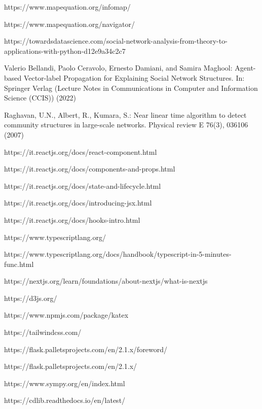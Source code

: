 \documentclass[a4paper,12pt]{report}
\begin{document}
%
%
\begin{thebibliography}{0}
%
https://www.mapequation.org/infomap/

https://www.mapequation.org/navigator/

https://towardsdatascience.com/social-network-analysis-from-theory-to-applications-with-python-d12e9a34c2c7

Valerio Bellandi, Paolo Ceravolo, Ernesto Damiani, and Samira Maghool: Agent-based Vector-label Propagation for Explaining Social Network Structures. In: Springer Verlag (Lecture Notes in Communications in Computer and Information Science (CCIS)) (2022)

Raghavan, U.N., Albert, R., Kumara, S.: Near linear time algorithm to detect
community structures in large-scale networks. Physical review E 76(3), 036106
(2007)

https://it.reactjs.org/docs/react-component.html

https://it.reactjs.org/docs/components-and-props.html

https://it.reactjs.org/docs/state-and-lifecycle.html

https://it.reactjs.org/docs/introducing-jsx.html

https://it.reactjs.org/docs/hooks-intro.html

https://www.typescriptlang.org/

https://www.typescriptlang.org/docs/handbook/typescript-in-5-minutes-func.html

https://nextjs.org/learn/foundations/about-nextjs/what-is-nextjs

https://d3js.org/

https://www.npmjs.com/package/katex

https://tailwindcss.com/

https://flask.palletsprojects.com/en/2.1.x/foreword/

https://flask.palletsprojects.com/en/2.1.x/

https://www.sympy.org/en/index.html

https://cdlib.readthedocs.io/en/latest/
%
\end{thebibliography}
% 
\end{document}
